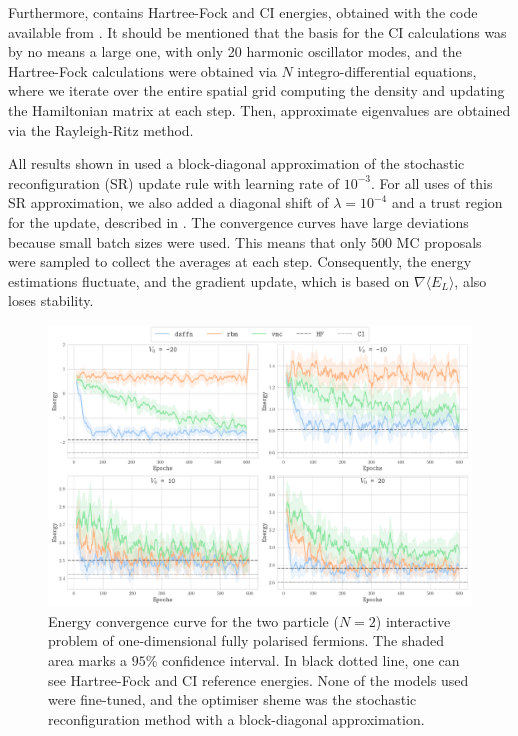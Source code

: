Furthermore,  contains Hartree-Fock and CI energies, obtained with the code available from \cite{drissifermion}. It should be mentioned that the basis for the CI calculations was by no means a large one, with only 20 harmonic oscillator modes, and the Hartree-Fock calculations were obtained via $N$ integro-differential equations, where we iterate over the entire spatial grid computing the density and updating the Hamiltonian matrix at each step. Then, approximate eigenvalues are obtained via the Rayleigh-Ritz method.

All results shown in  used a block-diagonal approximation of the stochastic reconfiguration (SR) update rule with learning rate of $10^{-3}$. For all uses of this SR approximation, we also added a diagonal shift of $\lambda = 10^{-4}$ and a trust region for the update, described in . The convergence curves have large deviations because small batch sizes were used. This means that only 500 MC proposals were sampled to collect the averages at each step. Consequently, the energy estimations fluctuate, and the gradient update, which is based on $\nabla \langle E_L\rangle$, also loses stability. 
\begin{figure}[H]
    \centering
    \includegraphics[width=1\linewidth]{Chapters/Results/N2/energy_convergence_v0_all.pdf}
    \caption{Energy convergence curve for the two particle ($N=2$) interactive problem of one-dimensional fully polarised fermions. The shaded area marks a $95\%$ confidence interval. In black dotted line, one can see Hartree-Fock and CI reference energies. None of the models used were fine-tuned, and the optimiser sheme was the stochastic reconfiguration method with a block-diagonal approximation.}
    \label{fig:N2_models_differentV0}
\end{figure}

